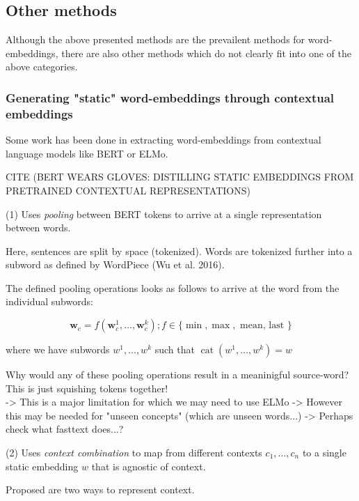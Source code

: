 \documentclass[a4paper,12pt,twoside,openright]{report}
\begin{document}


\subsection{Other methods}

Although the above presented methods are the prevailent methods for word-embeddings, there are also other methods which do not clearly fit into one of the above categories.

\subsubsection{Generating "static" word-embeddings through contextual embeddings}

Some work has been done in extracting word-embeddings from contextual language models like BERT or ELMo.

CITE (BERT WEARS GLOVES: DISTILLING STATIC EMBEDDINGS FROM PRETRAINED CONTEXTUAL REPRESENTATIONS)

(1) Uses \textit{pooling} between BERT tokens to arrive at a single representation between words.

Here, sentences are split by space (tokenized).
Words are tokenized further into a subword as defined by WordPiece (Wu et al. 2016).

The defined pooling operations looks as follows to arrive at the word from the individual subwords:

$$
\mathbf{w}_{c}=f\left(\mathbf{w}_{c}^{1}, \ldots, \mathbf{w}_{c}^{k}\right) ; f \in\{\min , \max , \text { mean, last }\}
$$

where we have subwords $w^{1},  \ldots, w^{k}$ such that $\operatorname{cat}\left(w^{1}, \ldots, w^{k}\right)=w$

Why would any of these pooling operations result in a meaninigful source-word? 
This is just squishing tokens together! \\

-> This is a major limitation for which we may need to use ELMo
-> However this may be needed for "unseen concepts" (which are unseen words...)
-> Perhaps check what fasttext does...?


(2) Uses \textit{context combination} to map from different contexts $c_1, \ldots, c_n$ to a single static embedding $w$ that is agnostic of context.

Proposed are two ways to represent context.
\end{document}

